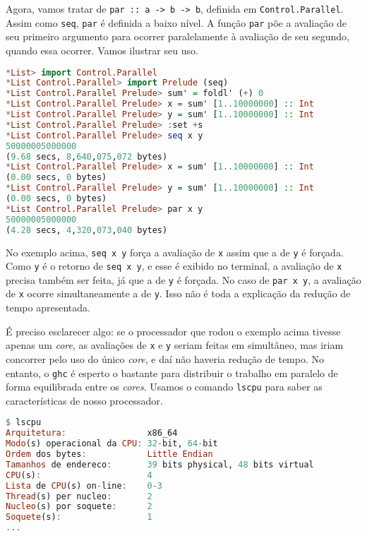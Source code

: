 \documentclass[a4paper]{article}
\begin{document}
Agora, vamos tratar de \texttt{par :: a -> b -> b}, definida em \texttt{Control.Parallel}.
Assim como \texttt{seq}, \texttt{par} é definida a baixo nível.
A função \texttt{par} põe a avaliação de seu primeiro argumento para ocorrer paralelamente à avaliação de seu segundo, quando essa ocorrer.
Vamos ilustrar seu uso.

\begin{lstlisting}[language=haskell, frame=single]
*List> import Control.Parallel
*List Control.Parallel> import Prelude (seq)
*List Control.Parallel Prelude> sum' = foldl' (+) 0
*List Control.Parallel Prelude> x = sum' [1..10000000] :: Int
*List Control.Parallel Prelude> y = sum' [1..10000000] :: Int
*List Control.Parallel Prelude> :set +s
*List Control.Parallel Prelude> seq x y
50000005000000
(9.68 secs, 8,640,075,072 bytes)
*List Control.Parallel Prelude> x = sum' [1..10000000] :: Int
(0.00 secs, 0 bytes)
*List Control.Parallel Prelude> y = sum' [1..10000000] :: Int
(0.00 secs, 0 bytes)
*List Control.Parallel Prelude> par x y
50000005000000
(4.28 secs, 4,320,073,040 bytes)
\end{lstlisting}

No exemplo acima, \texttt{seq x y} força a avaliação de \texttt{x} assim que a de \texttt{y} é forçada.
Como \texttt{y} é o retorno de \mbox{\texttt{seq x y}}, e esse é exibido no terminal, a avaliação de \texttt{x} precisa também ser feita, já que a de \texttt{y} é forçada.
No caso de \texttt{par x y}, a avaliação de \texttt{x} ocorre simultaneamente a de \texttt{y}.
Isso não é toda a explicação da redução de tempo apresentada.

É preciso esclarecer algo: se o processador que rodou o exemplo acima tivesse apenas um \emph{core}, as avaliações de \texttt{x} e \texttt{y} seriam feitas em simultâneo, mas iriam concorrer pelo uso do único \emph{core}, e daí não haveria redução de tempo.
No entanto, o \texttt{ghc} é esperto o bastante para distribuir o trabalho em paralelo de forma equilibrada entre os \emph{cores}.
Usamos o comando \texttt{lscpu} para saber as características de nosso processador.

\begin{lstlisting}[language=haskell, frame=single]
$ lscpu
Arquitetura:                x86_64
Modo(s) operacional da CPU: 32-bit, 64-bit
Ordem dos bytes:            Little Endian
Tamanhos de endereco:       39 bits physical, 48 bits virtual
CPU(s):                     4
Lista de CPU(s) on-line:    0-3
Thread(s) per nucleo:       2
Nucleo(s) por soquete:      2
Soquete(s):                 1
...
\end{lstlisting}
\end{document}
